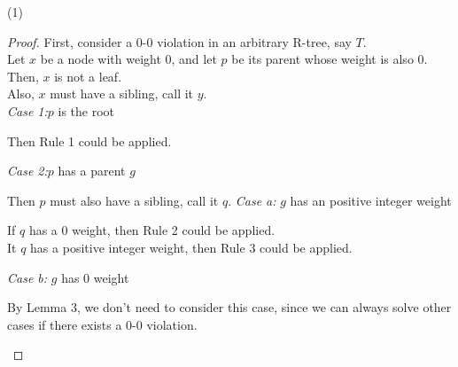 \documentclass[10pt]{article}
\begin{document}
\begin{enumerate}
	(1)
	\begin{proof}
	First, consider a 0-0 violation in an arbitrary R-tree, say $T$. \\
	Let $x$ be a node with weight 0, and let $p$ be its parent whose weight is also 0. \\
	Then, $x$ is not a leaf. \\
	Also, $x$ must have a sibling, call it $y$. \\
	\textit{Case 1:}$p$ is the root
	\begin{addmargin}[1em]{0em}
		Then Rule 1 could be applied.
	\end{addmargin}
	\textit{Case 2:}$p$ has a parent $g$
	\begin{addmargin}[1em]{0em}
		Then $p$ must also have a sibling, call it $q$. 
		\textit{Case a:} $g$ has an positive integer weight
		\begin{addmargin}[1em]{0em}
			If $q$ has a 0 weight, then Rule 2 could be applied. \\
			It $q$ has a positive integer weight, then Rule 3 could be applied.
		\end{addmargin}
		\textit{Case b:} $g$ has 0 weight
		\begin{addmargin}[1em]{0em}
			By Lemma 3, we don't need to consider this case, since we can always solve other cases if there exists a 0-0 violation.
		\end{addmargin}
	\end{addmargin}
	\end{proof}


\end{enumerate}
\end{document}
